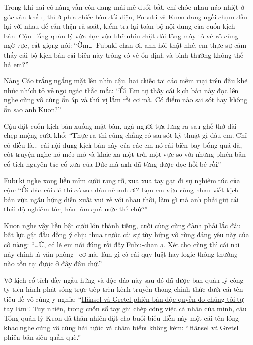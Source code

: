 \documentclass[../main.tex]{subfiles}
\begin{document}
Trong khi hai cô nàng vẫn còn đang mải mê đuổi bắt, chí chóe nhau náo nhiệt ở góc sân khấu, thì ở phía chiếc bàn đối diện, Fubuki và Kuon đang ngồi chụm đầu lại với nhau để cẩn thận rà soát, kiểm tra lại toàn bộ nội dung của cuốn kịch bản. Cậu Tổng quản lý vừa đọc vừa khẽ nhíu chặt đôi lông mày tỏ vẻ vô cùng ngờ vực, cất giọng nói: ``Ờm\dots\ Fubuki-chan ơi, anh hỏi thật nhé, em thực sự cảm thấy cái bộ kịch bản cải biên này trông có vẻ ổn định và bình thường không thế hả em?''

Nàng Cáo trắng ngẩng mặt lên nhìn cậu, hai chiếc tai cáo mềm mại trên đầu khẽ nhúc nhích tỏ vẻ ngơ ngác thắc mắc: ``Ể? Em tự thấy cái kịch bản này đọc lên nghe cũng vô cùng ổn áp và thú vị lắm rồi cơ mà. Có điểm nào sai sót hay không ổn sao anh Kuon?''

Cậu đặt cuốn kịch bản xuống mặt bàn, ngả người tựa lưng ra sau ghế thở dài chẹp miệng cười khổ: ``Thực ra thì cũng chẳng có sai sót kỹ thuật gì đâu em. Chỉ có điều là\dots\ cái nội dung kịch bản này của các em nó cải biên bay bổng quá đà, cốt truyện nghe nó méo mó và khác xa một trời một vực so với những phiên bản cổ tích nguyên tác cổ xưa của Đức mà anh đã từng được đọc hồi bé rồi.''

Fubuki nghe xong liền mỉm cười rạng rỡ, xua xua tay gạt đi sự nghiêm túc của cậu: ``Ối dào cái đó thì có sao đâu nè anh ơi? Bọn em vừa cùng nhau viết kịch bản vừa ngẫu hứng diễn xuất vui vẻ với nhau thôi, làm gì mà anh phải giữ cái thái độ nghiêm túc, hàn lâm quá mức thế chứ?''

Kuon nghe vậy liền bật cười lớn thành tiếng, cuối cùng cũng đành phải lắc đầu bất lực gật đầu đồng ý chịu thua trước cái sự tùy hứng vô cùng đáng yêu này của cô nàng: ``\dots Ừ, có lẽ em nói đúng rồi đấy Fubu-chan ạ. Xét cho cùng thì cái nơi này chính là văn phòng \hll\ cơ mà, làm gì có cái quy luật hay logic thông thường nào tồn tại được ở đây đâu chứ.''

Vở kịch cổ tích đầy ngẫu hứng và độc đáo này sau đó đã được ban quản lý công ty tiến hành phát sóng trực tiếp trên kênh truyền thông chính thức dưới cái tên tiêu đề vô cùng ý nghĩa: ``\uline{Hänsel và Gretel phiên bản độc quyền do chúng tôi tự tay làm}''. Tuy nhiên, trong cuốn sổ tay ghi chép công việc cá nhân của mình, cậu Tổng quản lý Kuon đã thản nhiên đặt cho buổi biểu diễn này một cái tên lóng khác nghe cũng vô cùng hài hước và châm biếm không kém: ``Hänsel và Gretel phiên bản siêu quần què.''
\end{document}
